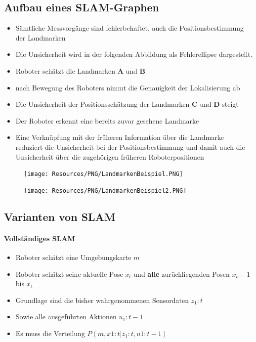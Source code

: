 \subsection{Aufbau eines SLAM-Graphen}
\begin{itemize}
	\item Sämtliche Messvorgänge sind fehlerbehaftet, auch die
		Positionsbestimmung der Landmarken
	\item Die Unsicherheit wird in der folgenden Abbildung als Fehlerellipse
		dargestellt.
	\item Roboter schätzt die Landmarken \textbf{A} und \textbf{B}
	\item nach Bewegung des Roboters nimmt die Genauigkeit der Lokalisierung ab
	\item Die Unsicherheit der Positionsschätzung der Landmarken \textbf{C} und
		\textbf{D} steigt
	\item Der Roboter erkennt eine bereits zuvor gesehene Landmarke
	\item Eine Verknüpfung mit der früheren Information über die Landmarke
		reduziert die Unsicherheit bei der Positionsbestimmung und damit auch die
		Unsicherheit über die zugehörigen früheren Roboterpositionen
\end{itemize}
\begin{minipage}[]{0.4\textwidth}
\begin{figure}[H]
	\begin{center}
		\texttt{[image: Resources/PNG/LandmarkenBeispiel.PNG]}
		\caption{}
		\label{fig:PNG/LandmarkenBeispiel.PNG}
	\end{center}
\end{figure}
\end{minipage}
\begin{minipage}[]{0.4\textwidth}
\begin{figure}[H]
	\begin{center}
		\texttt{[image: Resources/PNG/LandmarkenBeispiel2.PNG]}
		\caption{}
		\label{fig:PNG/LandmarkenBeispie2l.PNG}
	\end{center}
\end{figure}
\end{minipage}

\subsection{Varianten von SLAM}
\paragraph{Vollständiges SLAM}
\begin{itemize}
	\item Roboter schätzt eine Umgebungskarte $m$
	\item Roboter schätzt seine aktuelle Pose $x_t$ und \textbf{alle}
		zurückliegenden Posen $x_t-1$ bis $x_1$
	\item Grundlage sind die bisher wahrgenommenen Sensordaten $z_1:t$
	\item Sowie alle ausgeführten Aktionen $u_1:t-1$
	\item Es muss die Verteilung $P(m, x1:t | z_1:t, u1:t-1)$
\end{itemize}

